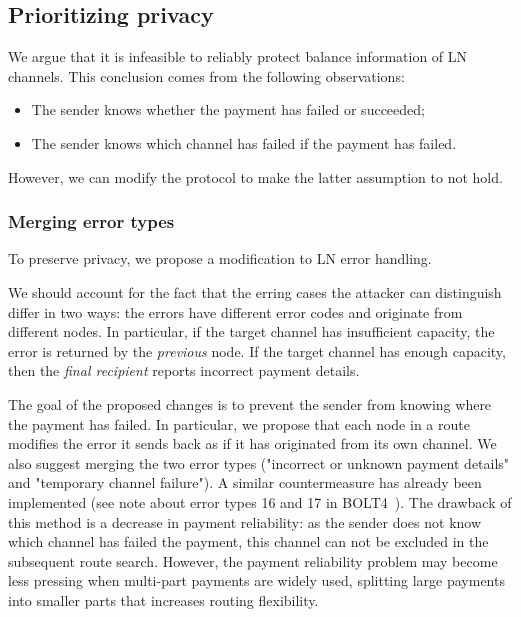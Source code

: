 \subsection{Prioritizing privacy}

We argue that it is infeasible to reliably protect balance information of LN channels.
This conclusion comes from the following observations:
\begin{itemize}
	\item The sender knows whether the payment has failed or succeeded;
	\item The sender knows which channel has failed if the payment has failed.
\end{itemize}

However, we can modify the protocol to make the latter assumption to not hold.

\subsubsection*{Merging error types}
To preserve privacy, we propose a modification to LN error handling.

We should account for the fact that the erring cases the attacker can distinguish differ in two ways: the errors have different error codes and originate from different nodes.
In particular, if the target channel has insufficient capacity, the error is returned by the \textit{previous} node.
If the target channel has enough capacity, then the \textit{final recipient} reports incorrect payment details.

The goal of the proposed changes is to prevent the sender from knowing where the payment has failed.
In particular, we propose that each node in a route modifies the error it sends back as if it has originated from its own channel.
We also suggest merging the two error types ("incorrect or unknown payment details" and "temporary channel failure").
A similar countermeasure has already been implemented (see note about error types 16 and 17 in BOLT4~\cite{Bolt4OnionRouting}).
The drawback of this method is a decrease in payment reliability: as the sender does not know which channel has failed the payment, this channel can not be excluded in the subsequent route search.
However, the payment reliability problem may become less pressing when multi-part payments are widely used, splitting large payments into smaller parts that increases routing flexibility.


